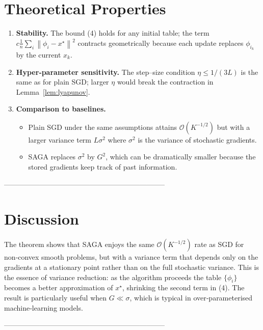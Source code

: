 \documentclass{article}
\newcommand{\norm}[1]{\left\lVert #1\right\rVert}
\begin{document}
\section*{Theoretical Properties}
\begin{enumerate}[label=\arabic*.]
  \item \textbf{Stability.} The bound (4) holds for any initial table; the term $c\frac{1}{n}\sum_i\norm{\phi_i-x^{\star}}^{2}$ contracts geometrically because each update replaces $\phi_{i_k}$ by the current $x_k$.
  \item \textbf{Hyper‑parameter sensitivity.} The step–size condition $\eta\le 1/(3L)$ is the same as for plain SGD; larger $\eta$ would break the contraction in Lemma~\ref{lem:lyapunov}.
  \item \textbf{Comparison to baselines.}
    \begin{itemize}
      \item Plain SGD under the same assumptions attains $\mathcal{O}(K^{-1/2})$ but with a larger variance term $L\sigma^{2}$ where $\sigma^{2}$ is the variance of stochastic gradients.
      \item SAGA replaces $\sigma^{2}$ by $G^{2}$, which can be dramatically smaller because the stored gradients keep track of past information.
    \end{itemize}
\end{enumerate}

--------------------------------------------------------------------

\section*{Discussion}
The theorem shows that SAGA enjoys the same $\mathcal{O}(K^{-1/2})$ rate as SGD for non‑convex smooth problems, but with a variance term that depends only on the gradients at a stationary point rather than on the full stochastic variance. This is the essence of variance reduction: as the algorithm proceeds the table $\{\phi_i\}$ becomes a better approximation of $x^{\star}$, shrinking the second term in (4). The result is particularly useful when $G\ll\sigma$, which is typical in over‑parameterised machine‑learning models.

--------------------------------------------------------------------
\end{document}
